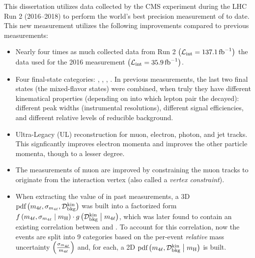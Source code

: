 This dissertation utilizes data collected by the CMS experiment during the LHC Run 2 (2016--2018) to
perform the world's best precision measurement of \mH to date.
This new measurement utilizes the following improvements compared to previous measurements:
\begin{itemize}
    \item Nearly four times as much collected data from Run 2 $\left( \mathcal{L}_\text{int} = 137.1\,\text{fb}^{\text{$-$}1} \right)$ \vs the data used for the 2016 measurement $\left( \mathcal{L}_\text{int} = 35.9\,\text{fb}^{\text{$-$}1} \right)$.
    \item Four final-state categories: \fourmu, \foure, \twoetwomu, \twomutwoe.
    In previous measurements, the last two final states (the mixed-flavor states) were combined, when truly they have different kinematical properties (depending on into which lepton pair the \Zone decayed):
    different peak widths (instrumental resolutions), different signal efficiencies, and different relative levels of reducible background.
    \item Ultra-Legacy (UL) reconstruction for muon, electron, photon, and jet tracks.
    This signficantly improves electron momenta and improves the other particle momenta, though to a lesser degree.
    \item The measurements of muon \pt are improved by constraining the muon tracks to originate from the interaction vertex (also called a \emph{vertex constraint}).
    \item When extracting the value of \mH in past measurements, a 3D $\text{pdf} \left( m_{4\ell}, \sigma_{m_{4\ell}}, \mathcal{D}^{\text{kin}}_{\text{bkg}} \right)$ was built into a factorized form
    $f \left( m_{4\ell}, \sigma_{m_{4\ell}} \; \middle| \;{} m_{\mathrm{H}} \right)   \cdot   g\left( \mathcal{D}^{\text{kin}}_{\text{bkg}} \; \middle| \;{} m_{4\ell} \right)$,
    which was later found to contain an existing correlation between \mfourlerr and \Dkinbkg.
    To account for this correlation, now the events are split into 9 categories based on the per-event \emph{relative} mass uncertainty $\left( \frac{\sigma_{m_{4\ell}}}{m_{4\ell}} \right)$ and, for each, a 2D $\text{pdf} \left( m_{4\ell}, \mathcal{D}^{\text{kin}}_{\text{bkg}} \; \middle| \;{} m_{\mathrm{H}} \right)$ is built.

\end{itemize}
